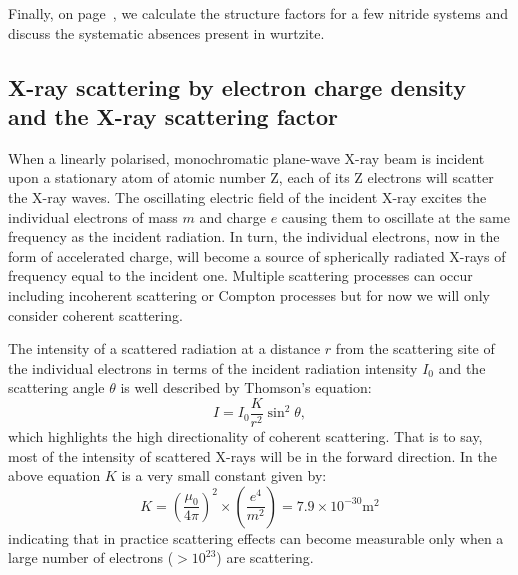  Finally, on page~\pageref{sec:SF_GAN}, we calculate the structure factors for a few nitride systems and discuss the systematic absences present in wurtzite. 






\subsection{X-ray scattering by electron charge density and the X-ray scattering factor}

When a linearly polarised, monochromatic plane-wave X-ray beam is incident upon a stationary atom of atomic number Z, each of its Z electrons will scatter the X-ray waves. The oscillating electric field of the incident X-ray excites the individual electrons of mass $m$ and charge $e$ causing them to oscillate at the same frequency as the incident radiation. In turn, the individual electrons, now in the form of accelerated charge, will become a source of spherically radiated X-rays of frequency equal to the incident one. Multiple scattering processes can occur including incoherent scattering or Compton processes but for now we will only consider coherent scattering.


The intensity of a scattered radiation at a distance $r$ from the scattering site of the individual electrons in terms of the incident radiation intensity $I_0$ and the scattering angle $\theta$ is well described by Thomson's equation:
\begin{equation}
I = I_0 \frac{K}{r^2}\sin^2 {\theta},
\end{equation}
which highlights the high directionality of coherent scattering. That is to say, most of the intensity of scattered X-rays will be in the forward direction. In the above equation $K$ is a very small constant given by:
\begin{equation*}
K = \left( \frac{\mu_0}{4 \pi} \right)^2 \times \left( \frac{e^4}{m^2} \right) = 7.9 \times 10^{-30} \si{\meter}^2
\end{equation*}
indicating that in practice scattering effects can become measurable only when a large number of electrons ($ > 10^{23}$) are scattering.

